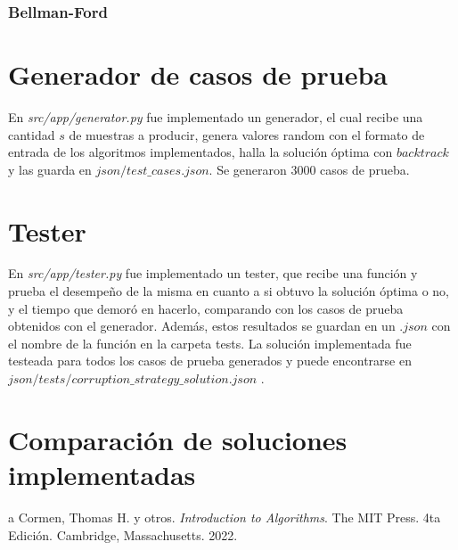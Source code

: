 \documentclass[10pt]{article} %
\begin{document}
	\subsubsection{Bellman-Ford}
	
	\section{Generador de casos de prueba}
	
	En \textit{src/app/generator.py} fue implementado un generador, el cual recibe una cantidad $ s $ de muestras a producir, genera valores random con el formato de entrada de los algoritmos implementados, halla la soluci\'on \'optima con $ backtrack $ y las guarda en $ json/test\_cases.json $. Se generaron 3000 casos de prueba.
	
	\section{Tester}
	En \textit{src/app/tester.py} fue implementado un tester, que recibe una funci\'on y prueba el desempe\~no de la misma en cuanto a si obtuvo la soluci\'on \'optima o no, y el tiempo que demor\'o en hacerlo, comparando con los casos de prueba obtenidos con el generador. Adem\'as, estos resultados se guardan en un $ .json $ con el nombre de la funci\'on en la carpeta tests. La soluci\'on implementada fue testeada para todos los casos de prueba generados y puede encontrarse en $ json/tests/corruption\_strategy\_solution.json $ .
	
	\section{Comparaci\'on de soluciones implementadas}          

%    
%    
%    
%	
	
	\begin{thebibliography}
		a
		 Cormen, Thomas H. y otros. \emph{Introduction to Algorithms}. 
		The MIT Press.
		4ta Edici\'on.		
		Cambridge, Massachusetts.
		2022.
	\end{thebibliography}
\end{document}
